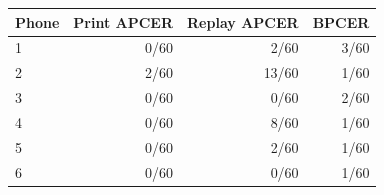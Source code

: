 \begin{tabular}[t]{lrrr}
\toprule
Phone & Print APCER & Replay APCER & BPCER \\
\midrule
1 & 0/60 & 2/60 & 3/60 \\
2 & 2/60 & 13/60 & 1/60 \\
3 & 0/60 & 0/60 & 2/60 \\
4 & 0/60 & 8/60 & 1/60 \\
5 & 0/60 & 2/60 & 1/60 \\
6 & 0/60 & 0/60 & 1/60 \\
\bottomrule
\end{tabular}
